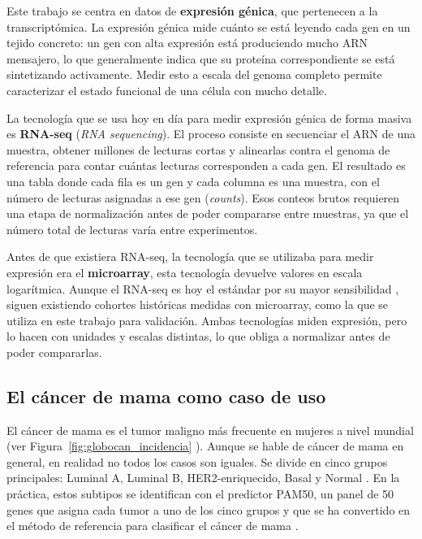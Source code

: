 \documentclass[12pt, a4paper]{report}
\begin{document}
Este trabajo se centra en datos de \textbf{expresión génica}, que pertenecen a la transcriptómica. La expresión génica mide cuánto se está leyendo cada gen en un tejido concreto: un gen con alta expresión está produciendo mucho ARN mensajero, lo que generalmente indica que su proteína correspondiente se está sintetizando activamente. Medir esto a escala del genoma completo permite caracterizar el estado funcional de una célula con mucho detalle.

La tecnología que se usa hoy en día para medir expresión génica de forma masiva es \textbf{RNA-seq} (\textit{RNA sequencing}). El proceso consiste en secuenciar el ARN de una muestra, obtener millones de lecturas cortas y alinearlas contra el genoma de referencia para contar cuántas lecturas corresponden a cada gen. El resultado es una tabla donde cada fila es un gen y cada columna es una muestra, con el número de lecturas asignadas a ese gen (\textit{counts}). Esos conteos brutos requieren una etapa de normalización antes de poder compararse entre muestras, ya que el número total de lecturas varía entre experimentos.

Antes de que existiera RNA-seq, la tecnología que se utilizaba para medir expresión era el \textbf{microarray}, esta tecnología devuelve valores en escala logarítmica. Aunque el RNA-seq es hoy el estándar por su mayor sensibilidad \cite{stark_rna_2019}, siguen existiendo cohortes históricas medidas con microarray, como la que se utiliza en este trabajo para validación. Ambas tecnologías miden expresión, pero lo hacen con unidades y escalas distintas, lo que obliga a normalizar antes de poder compararlas.

\subsection{El cáncer de mama como caso de uso}

El cáncer de mama es el tumor maligno más frecuente en mujeres a nivel mundial (ver Figura~\ref{fig:globocan_incidencia} \cite{ferlay_global_2024}). Aunque se hable de cáncer de mama en general, en realidad no todos los casos son iguales. Se divide en cinco grupos principales: Luminal A, Luminal B, HER2-enriquecido, Basal y Normal \cite{sorlie_gene_2001}. 
En la práctica, estos subtipos se identifican con el predictor PAM50, un panel de 50 genes que asigna cada tumor a uno de los cinco grupos y que se ha convertido en el método de referencia para clasificar el cáncer de mama \cite{parker_supervised_2009}.
\end{document}
